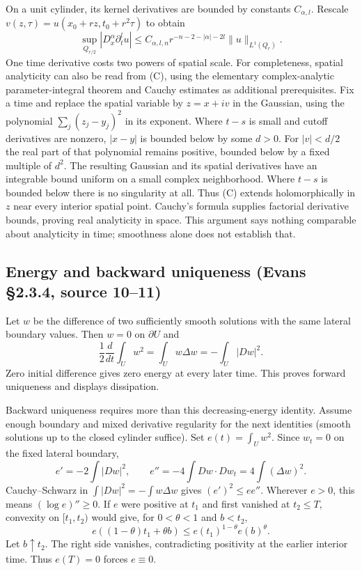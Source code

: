 On a unit cylinder, its kernel derivatives are bounded by constants
$C_{\alpha,l}$. Rescale $v(z,\tau)=u(x_0+rz,t_0+r^2\tau)$ to obtain
\[
 \sup_{Q_{r/2}}|D_x^\alpha\partial_t^l u|
 \leq C_{\alpha,l,n}r^{-n-2-|\alpha|-2l}
                          \|u\|_{L^1(Q_r)} .
\]
One time derivative costs two powers of spatial scale.
For completeness, spatial analyticity can also be read from (C), using
the elementary complex-analytic parameter-integral theorem and Cauchy
estimates as additional prerequisites. Fix a time and replace the spatial
variable by $z=x+iv$ in the Gaussian, using the polynomial
$\sum_j(z_j-y_j)^2$ in its exponent. Where $t-s$ is small and cutoff
derivatives are nonzero, $|x-y|$ is bounded below by some $d>0$.
For $|v|<d/2$ the real part of that polynomial remains positive,
bounded below by a fixed multiple of $d^2$.
The resulting Gaussian and its spatial derivatives have an integrable
bound uniform on a small complex neighborhood.
Where $t-s$ is bounded below there is no singularity at all.
Thus (C) extends holomorphically in $z$ near every interior spatial point.
Cauchy's formula supplies factorial derivative bounds, proving real
analyticity in space. This argument says nothing comparable about
analyticity in time; smoothness alone does not establish that.
\Needspace{45mm}

\subsection{Energy and backward uniqueness (Evans \S2.3.4, source 10--11)}
Let $w$ be the difference of two sufficiently smooth solutions with
the same lateral boundary values. Then $w=0$ on $\partial U$ and
\[
 \frac12\frac d{dt}\int_Uw^2
 =\int_Uw\Delta w=-\int_U|Dw|^2.
\]
Zero initial difference gives zero energy at every later time.
This proves forward uniqueness and displays dissipation.

Backward uniqueness requires more than this decreasing-energy identity.
Assume enough boundary and mixed derivative regularity for the next
identities (smooth solutions up to the closed cylinder suffice).
Set $e(t)=\int_Uw^2$. Since $w_t=0$ on the fixed lateral boundary,
\[
 e'=-2\int|Dw|^2,\qquad
 e''=-4\int Dw\cdot Dw_t=4\int(\Delta w)^2.
\]
Cauchy--Schwarz in $\int|Dw|^2=-\int w\Delta w$ gives
$(e')^2\leq ee''$. Wherever $e>0$, this means
$(\log e)''\geq0$.
If $e$ were positive at $t_1$ and first vanished at $t_2\leq T$,
convexity on $[t_1,t_2)$ would give, for $0<\theta<1$ and $b<t_2$,
\[
 e((1-\theta)t_1+\theta b)
 \leq e(t_1)^{1-\theta}e(b)^\theta .
\]
Let $b\uparrow t_2$. The right side vanishes, contradicting positivity
at the earlier interior time. Thus $e(T)=0$ forces $e\equiv0$.
\Needspace{45mm}
